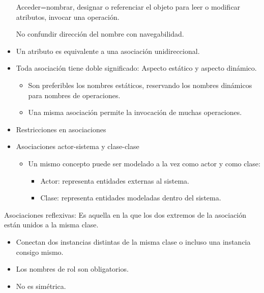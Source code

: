 \documentclass[12pt, twoside, openright]{report} %
\begin{document}
\begin{itemize}
	      Acceder=nombrar, designar o referenciar el objeto para leer o
	      modificar atributos, invocar una operación.

	      No confundir dirección del nombre con navegabilidad.
	\item Un atributo es equivalente a una asociación unidireccional.
	\item Toda asociación tiene doble significado: Aspecto estático y
	      aspecto dinámico.

	      \begin{itemize}
		      \item Son preferibles los nombres estáticos, reservando los nombres
		            dinámicos para nombres de operaciones.
		      \item Una misma asociación permite la invocación de muchas
		            operaciones.
	      \end{itemize}
	\item Restricciones en asociaciones
	      \begin{figure}[H]
		      {\def\svgwidth{.75\textwidth}
			      }
	      \end{figure}
	\item Asociaciones actor-sistema y clase-clase

	      \begin{itemize}
		      \item Un mismo concepto puede ser modelado a la vez como actor y como
		            clase:

		            \begin{itemize}
			            \item Actor: representa entidades externas al sistema.
			            \item Clase: representa entidades modeladas dentro del sistema.
		            \end{itemize}
	      \end{itemize}
\end{itemize}

Asociaciones reflexivas: Es aquella en la que los dos extremos de la
asociación están unidos a la misma clase.

\begin{itemize}
	\item Conectan dos instancias distintas de la misma clase o incluso una
	      instancia consigo mismo.
	\item Los nombres de rol son obligatorios.
	\item No es simétrica.
\end{itemize}
\end{document}
